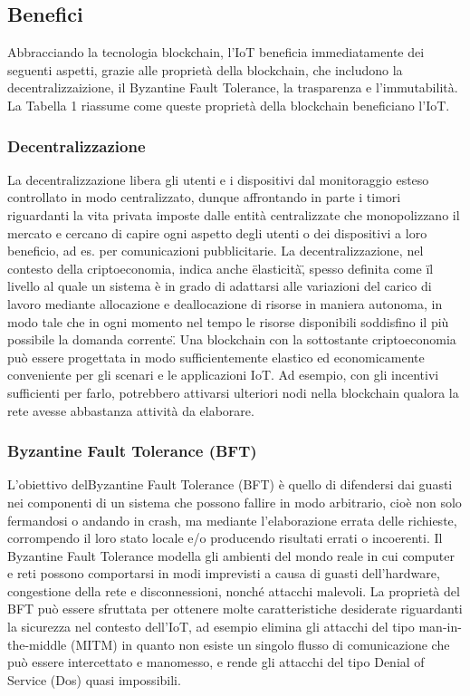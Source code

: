 \documentclass[a4paper,12pt,draft]{article}
\begin{document}
\subsection{Benefici}
Abbracciando la tecnologia blockchain, l'IoT beneficia immediatamente dei seguenti aspetti, grazie alle proprietà della blockchain, che includono la decentralizzaizione, il Byzantine Fault Tolerance, la trasparenza e l'immutabilità. La Tabella 1 riassume come queste proprietà della blockchain beneficiano l'IoT.


\subsubsection{Decentralizzazione}
La decentralizzazione libera gli utenti e i dispositivi dal monitoraggio esteso controllato in modo centralizzato, dunque affrontando in parte i timori riguardanti la vita privata imposte dalle entità centralizzate che monopolizzano il mercato e cercano di capire ogni aspetto degli utenti o dei dispositivi a loro beneficio, ad es. per comunicazioni pubblicitarie. La decentralizzazione, nel contesto della criptoeconomia, indica anche \"elasticità\", spesso definita come \"il livello al quale un sistema è in grado di adattarsi alle variazioni del carico di lavoro mediante allocazione e deallocazione di risorse in maniera autonoma, in modo tale che in ogni momento nel tempo le risorse disponibili soddisfino il più possibile la domanda corrente\". Una blockchain con la sottostante criptoeconomia può essere progettata in modo sufficientemente elastico ed economicamente conveniente per gli scenari e le applicazioni IoT. Ad esempio, con gli  incentivi sufficienti per farlo, potrebbero attivarsi ulteriori nodi nella blockchain qualora la rete avesse abbastanza attività da elaborare.

\subsubsection{Byzantine Fault Tolerance (BFT)}
L'obiettivo delByzantine Fault Tolerance (BFT) è quello di difendersi dai guasti nei componenti
di un sistema che possono fallire in modo arbitrario, cioè non solo fermandosi o andando in crash, ma mediante l'elaborazione errata delle richieste, corrompendo il loro stato locale e/o producendo risultati errati o incoerenti. Il Byzantine Fault Tolerance modella gli ambienti del mondo reale in cui computer e reti possono comportarsi in modi imprevisti a causa di guasti dell'hardware, congestione della rete e disconnessioni, nonché attacchi malevoli. La proprietà del BFT può essere sfruttata per ottenere molte caratteristiche desiderate riguardanti la sicurezza nel contesto dell'IoT, ad esempio elimina gli attacchi del tipo man-in-the-middle (MITM) in quanto non esiste un singolo flusso di comunicazione che può essere intercettato e manomesso, e rende gli attacchi del tipo Denial of Service (Dos) quasi impossibili.
\end{document}
